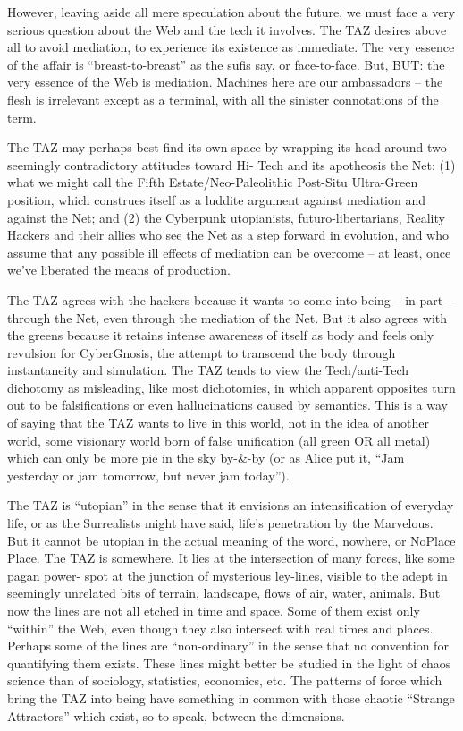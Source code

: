 \documentclass[a4paper,english,10pt,twoside]{article}
\begin{document}
\medskip
However, leaving aside all mere speculation about the future, we must face a very serious question about the Web and the tech it involves. The TAZ desires above all to avoid mediation, to experience its existence as immediate. The very essence of the affair is \enquote{breast-to-breast} as the sufis say, or face-to-face. But, BUT: the very essence of the Web is mediation. Machines here are our ambassadors -- the flesh is irrelevant except as a terminal, with all the sinister connotations of the term.

\medskip
The TAZ may perhaps best find its own space by wrapping its head around two seemingly contradictory attitudes toward Hi- Tech and its apotheosis the Net: (1) what we might call the Fifth Estate/Neo-Paleolithic Post-Situ Ultra-Green position, which construes itself as a luddite argument against mediation and against the Net; and (2) the Cyberpunk utopianists, futuro-libertarians, Reality Hackers and their allies who see the Net as a step forward in evolution, and who assume that any possible ill effects of mediation can be overcome -- at least, once we've liberated the means of production.

\medskip
The TAZ agrees with the hackers because it wants to come into being -- in part -- through the Net, even through the mediation of the Net. But it also agrees with the greens because it retains intense awareness of itself as body and feels only revulsion for CyberGnosis, the attempt to transcend the body through instantaneity and simulation. The TAZ tends to view the Tech/anti-Tech dichotomy as misleading, like most dichotomies, in which apparent opposites turn out to be falsifications or even hallucinations caused by semantics. This is a way of saying that the TAZ wants to live in this world, not in the idea of another world, some visionary world born of false unification (all green OR all metal) which can only be more pie in the sky by-\&-by (or as Alice put it, \enquote{Jam yesterday or jam tomorrow, but never jam today}).

\medskip
The TAZ is \enquote{utopian} in the sense that it envisions an intensification of everyday life, or as the Surrealists might have said, life's penetration by the Marvelous. But it cannot be utopian in the actual meaning of the word, nowhere, or NoPlace Place. The TAZ is somewhere. It lies at the intersection of many forces, like some pagan power- spot at the junction of mysterious ley-lines, visible to the adept in seemingly unrelated bits of terrain, landscape, flows of air, water, animals. But now the lines are not all etched in time and space. Some of them exist only \enquote{within} the Web, even though they also intersect with real times and places. Perhaps some of the lines are \enquote{non-ordinary} in the sense that no convention for quantifying them exists. These lines might better be studied in the light of chaos science than of sociology, statistics, economics, etc. The patterns of force which bring the TAZ into being have something in common with those chaotic \enquote{Strange Attractors} which exist, so to speak, between the dimensions.
\end{document}
